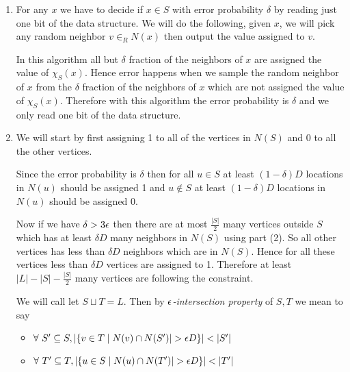 \documentclass[a4paper, 11pt]{article}
\begin{document}
{\begin{enumerate}
	
	
	\item For any $x$ we have to decide if $x\in S$ with error probability $\delta$ by reading just one bit of the data structure. We will do the following, given $x$, we will pick any random neighbor $v\in_R N(x)$ then output the value assigned to $v$.
	
	In this algorithm all but $\delta$ fraction of the neighbors of $x$ are assigned the value of $\chi_S(x)$. Hence error happens when we sample the random neighbor of $x$ from the $\delta$ fraction of the neighbors of $x$ which are not assigned the value of $\chi_S(x)$. Therefore with this algorithm the error probability is $\delta $ and we only read one bit of the data structure.
	
	\item We will start by first assigning 1 to all of the vertices in $N(S)$ and 0 to all the other vertices.\parinn
	
	Since the error probability is $\delta$ then for all $u\in S$ at least $(1-\delta )D$ locations in $N(u)$ should be assigned 1 and  $u\notin S$ at least $(1-\delta )D$ locations in $N(u)$ should be assigned 0.
	
	 Now if we have $\delta > 3\epsilon$ then there are at most $\frac{|S|}2$ many vertices outside $S$ which has at least $\delta D$ many neighbors in $N(S)$  using part (2). So all other vertices has less than $\delta D$ neighbors which are in $N(S)$. Hence for all these vertices less than $\delta D$ vertices are assigned to 1. Therefore at least $|L|-|S|-\frac{|S|}2$ many vertices are following the constraint. 
	 
	 We will call let $S\sqcup T=L$. Then  by $\epsilon$\textit{-intersection property} of $S,T$ we mean to say \begin{itemize}
	 	\item $\forall\ S'\subseteq S, |\{v\in T\mid N(v)\cap N(S')|>\eps D\}|< |S'|$
	 	\item $\forall\ T'\subseteq T, |\{u\in S\mid N(u)\cap N(T')|>\eps D\}|< |T'|$
	 \end{itemize}
\end{enumerate}
}
\pagebreak

\end{document}

